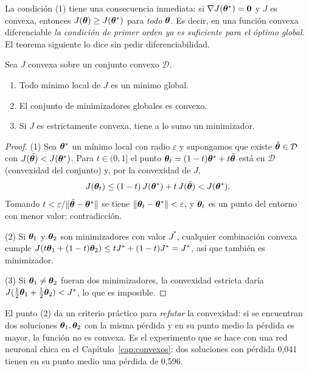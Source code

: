 La condición (1) tiene una consecuencia inmediata: si $\nabla J(\boldsymbol{\theta}^*) = \mathbf{0}$ y $J$ es convexa,
entonces $J(\boldsymbol{\theta}) \ge J(\boldsymbol{\theta}^*)$ para \emph{todo} $\boldsymbol{\theta}$. Es decir, en una función convexa diferenciable
\emph{la condición de primer orden ya es suficiente para el óptimo global}. El teorema siguiente lo dice
sin pedir diferenciabilidad.

\begin{teorema}
\label{teo:local_global}
Sea $J$ convexa sobre un conjunto convexo $\mathcal{D}$.
\begin{enumerate}
  \item Todo mínimo local de $J$ es un mínimo global.
  \item El conjunto de minimizadores globales es convexo.
  \item Si $J$ es estrictamente convexa, tiene a lo sumo un minimizador.
\end{enumerate}
\end{teorema}
\begin{proof}
(1) Sea $\boldsymbol{\theta}^*$ un mínimo local con radio $\varepsilon$ y supongamos que existe $\tilde{\boldsymbol{\theta}} \in \mathcal{D}$ con
$J(\tilde{\boldsymbol{\theta}}) < J(\boldsymbol{\theta}^*)$. Para $t \in (0,1]$ el punto $\boldsymbol{\theta}_t = (1-t)\boldsymbol{\theta}^* + t\tilde{\boldsymbol{\theta}}$ está en
$\mathcal{D}$ (convexidad del conjunto) y, por la convexidad de $J$,
\[
  J(\boldsymbol{\theta}_t) \le (1-t)\,J(\boldsymbol{\theta}^*) + t\,J(\tilde{\boldsymbol{\theta}}) < J(\boldsymbol{\theta}^*).
\]
Tomando $t < \varepsilon / \lVert\tilde{\boldsymbol{\theta}} - \boldsymbol{\theta}^*\rVert$ se tiene $\lVert\boldsymbol{\theta}_t - \boldsymbol{\theta}^*\rVert < \varepsilon$, y
$\boldsymbol{\theta}_t$ es un punto del entorno con menor valor: contradicción.

(2) Si $\boldsymbol{\theta}_1$ y $\boldsymbol{\theta}_2$ son minimizadores con valor $J^*$, cualquier combinación convexa cumple
$J(t\boldsymbol{\theta}_1 + (1-t)\boldsymbol{\theta}_2) \le tJ^* + (1-t)J^* = J^*$, así que también es minimizador.

(3) Si $\boldsymbol{\theta}_1 \neq \boldsymbol{\theta}_2$ fueran dos minimizadores, la convexidad estricta daría
$J(\tfrac12\boldsymbol{\theta}_1 + \tfrac12\boldsymbol{\theta}_2) < J^*$, lo que es imposible.
\end{proof}

\begin{observacion}
El punto (2) da un criterio práctico para \emph{refutar} la convexidad: si se encuentran dos soluciones
$\boldsymbol{\theta}_1, \boldsymbol{\theta}_2$ con la misma pérdida y en su punto medio la pérdida es mayor, la función no es convexa.
Es el experimento que se hace con una red neuronal chica en el Capítulo~\ref{cap:convexos}: dos soluciones
con pérdida 0,041 tienen en su punto medio una pérdida de 0,596.
\end{observacion}

